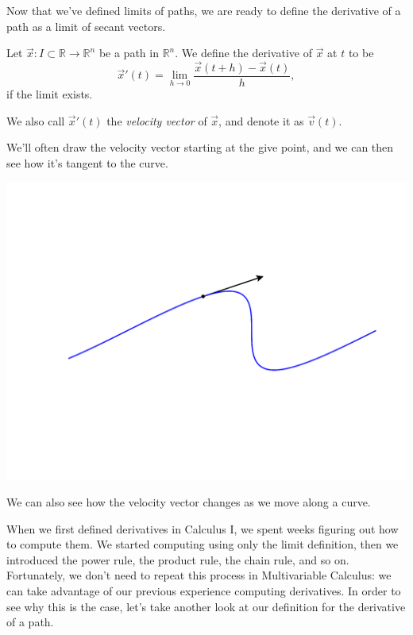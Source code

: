 \documentclass{ximera}
\begin{document}
Now that we've defined limits of paths, we are ready to define the derivative of a path as a limit of secant vectors.

\begin{definition}
Let $\vec{x}:I\subset\mathbb{R}\rightarrow\mathbb{R}^n$ be a path in $\mathbb{R}^n$. We define the derivative of $\vec{x}$ at $t$ to be
\[
\vec{x}'(t) = \lim_{h\rightarrow 0} \frac{\vec{x}(t+h) - \vec{x}(t)}{h},
\]
if the limit exists.

We also call $\vec{x}'(t)$ the \emph{velocity vector} of $\vec{x}$, and denote it as $\vec{v}(t)$.
\end{definition}

We'll often draw the velocity vector starting at the give point, and we can then see how it's tangent to the curve.

\begin{image}
\includegraphics[width=\textwidth]{CalcPlot3D-vel_vector}
\end{image}

We can also see how the velocity vector changes as we move along a curve.


When we first defined derivatives in Calculus I, we spent weeks figuring out how to compute them. We started computing using only the limit definition, then we introduced the power rule, the product rule, the chain rule, and so on. Fortunately, we don't need to repeat this process in Multivariable Calculus: we can take advantage of our previous experience computing derivatives. In order to see why this is the case, let's take another look at our definition for the derivative of a path.
\end{document}
